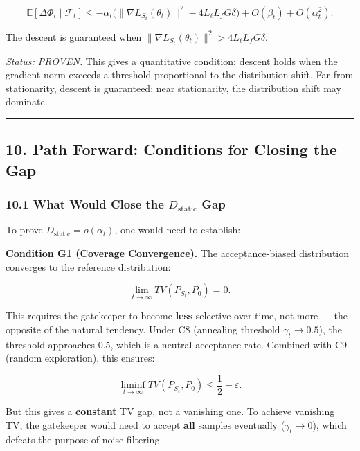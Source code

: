 \documentclass[
  12pt,
]{article}
\begin{document}
\[\mathbb{E}[\Delta\Phi_t \mid \mathcal{F}_t] \leq -\alpha_t \bigl(\|\nabla L_{S_t}(\theta_t)\|^2 - 4 L_\ell L_f G \delta \bigr) + O(\beta_t) + O(\alpha_t^2).\]

The descent is guaranteed when
\(\|\nabla L_{S_t}(\theta_t)\|^2 > 4 L_\ell L_f G \delta\).

\emph{Status: PROVEN.} This gives a quantitative condition: descent
holds when the gradient norm exceeds a threshold proportional to the
distribution shift. Far from stationarity, descent is guaranteed; near
stationarity, the distribution shift may dominate.

\begin{center}\rule{0.5\linewidth}{0.5pt}\end{center}

\subsection{10. Path Forward: Conditions for Closing the
Gap}\label{path-forward-conditions-for-closing-the-gap}

\subsubsection{\texorpdfstring{10.1 What Would Close the
\(D_{\text{static}}\)
Gap}{10.1 What Would Close the D\_\{\textbackslash text\{static\}\} Gap}}\label{what-would-close-the-d_textstatic-gap}

To prove \(D_{\text{static}} = o(\alpha_t)\), one would need to
establish:

\textbf{Condition G1 (Coverage Convergence).} The acceptance-biased
distribution converges to the reference distribution:

\[\lim_{t \to \infty} TV(P_{S_t}, P_0) = 0.\]

This requires the gatekeeper to become \textbf{less} selective over
time, not more --- the opposite of the natural tendency. Under C8
(annealing threshold \(\gamma_t \to 0.5\)), the threshold approaches
0.5, which is a neutral acceptance rate. Combined with C9 (random
exploration), this ensures:

\[\liminf_{t \to \infty} TV(P_{S_t}, P_0) \leq \frac{1}{2} - \varepsilon.\]

But this gives a \textbf{constant} TV gap, not a vanishing one. To
achieve vanishing TV, the gatekeeper would need to accept \textbf{all}
samples eventually (\(\gamma_t \to 0\)), which defeats the purpose of
noise filtering.
\end{document}
